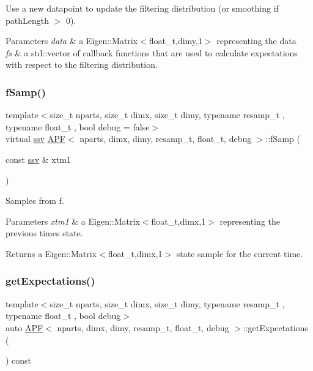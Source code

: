 Use a new datapoint to update the filtering distribution (or smoothing if path\+Length $>$ 0). 


\begin{DoxyParams}{Parameters}
{\em data} & a Eigen\+::\+Matrix$<$float\+\_\+t,dimy,1$>$ representing the data \\
\hline
{\em fs} & a std\+::vector of callback functions that are used to calculate expectations with respect to the filtering distribution. \\
\hline
\end{DoxyParams}
\mbox{\label{classAPF_a795a0d1a16de1004a6308b317d125340}} 
\subsubsection{\texorpdfstring{f\+Samp()}{fSamp()}}
{\footnotesize\ttfamily template$<$size\+\_\+t nparts, size\+\_\+t dimx, size\+\_\+t dimy, typename resamp\+\_\+t , typename float\+\_\+t , bool debug = false$>$ \\
virtual \hyperlink{classAPF_a8b170471292cd6fb5c3c19b55b42fc4e}{ssv} \hyperlink{classAPF}{A\+PF}$<$ nparts, dimx, dimy, resamp\+\_\+t, float\+\_\+t, debug $>$\+::f\+Samp (\begin{DoxyParamCaption}\item[{const \hyperlink{classAPF_a8b170471292cd6fb5c3c19b55b42fc4e}{ssv} \&}]{xtm1 }\end{DoxyParamCaption})\hspace{0.3cm}{\ttfamily [pure virtual]}}



Samples from f. 


\begin{DoxyParams}{Parameters}
{\em xtm1} & a Eigen\+::\+Matrix$<$float\+\_\+t,dimx,1$>$ representing the previous time\textquotesingle{}s state. \\
\hline
\end{DoxyParams}
\begin{DoxyReturn}{Returns}
a Eigen\+::\+Matrix$<$float\+\_\+t,dimx,1$>$ state sample for the current time. 
\end{DoxyReturn}
\mbox{\label{classAPF_ab531233df84dcae5bc93178d19495480}} 
\subsubsection{\texorpdfstring{get\+Expectations()}{getExpectations()}}
{\footnotesize\ttfamily template$<$size\+\_\+t nparts, size\+\_\+t dimx, size\+\_\+t dimy, typename resamp\+\_\+t , typename float\+\_\+t , bool debug$>$ \\
auto \hyperlink{classAPF}{A\+PF}$<$ nparts, dimx, dimy, resamp\+\_\+t, float\+\_\+t, debug $>$\+::get\+Expectations (\begin{DoxyParamCaption}{ }\end{DoxyParamCaption}) const}



